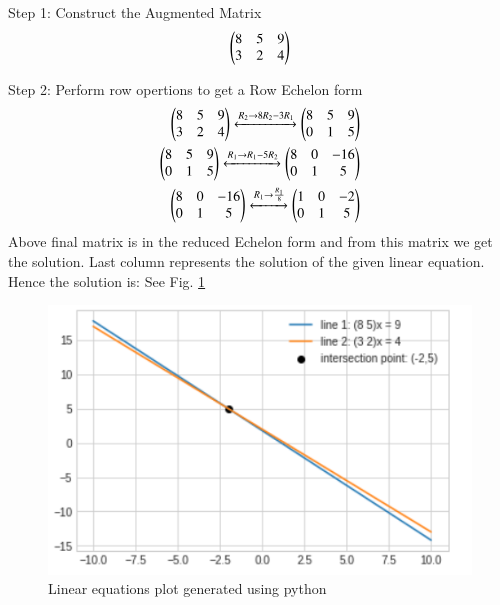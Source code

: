 Step 1: Construct the Augmented Matrix
\begin{align}
\begin{pmatrix}
8&5&9\\
3&2&4
\end{pmatrix}
\end{align}

Step 2: Perform row opertions to get a Row Echelon form\\
\begin{align}
\begin{pmatrix}
8&5&9\\
3&2&4 
\end{pmatrix}
\xleftrightarrow{ R_2\rightarrow 8 R_2-3 R_1}
\begin{pmatrix}
8&5&9\\
0&1&5
\end{pmatrix}\\
\begin{pmatrix}
8&5&9\\
0&1&5
\end{pmatrix}
\xleftrightarrow{ R_1\rightarrow R_1- 5 R_2}
\begin{pmatrix}
8&0& -16\\
0&1&5 
\end{pmatrix}\\
\begin{pmatrix}
8&0& -16\\
0&1&5 
\end{pmatrix}
\xleftrightarrow{ R_1\rightarrow \frac{R_1}{8}}
\begin{pmatrix}
1&0&-2\\
0&1&5
\end{pmatrix}
\end{align}
Above final matrix is in the reduced Echelon form and from this matrix we get the solution. Last column represents the solution of the given linear equation.
Hence the solution is: {}
See Fig. \ref{fig:plotsolutions/line_plane/22/}

\begin{figure}[!ht]
\centering
\includegraphics[width=\columnwidth]{./solutions/line_plane/22/plot.png}
\caption{Linear equations plot generated using python}
\label{fig:plotsolutions/line_plane/22/}
\end{figure}


